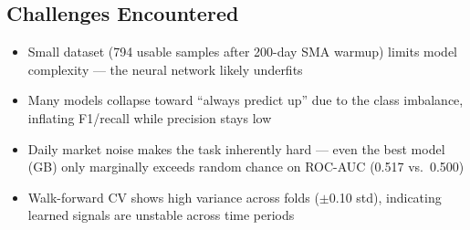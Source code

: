 \documentclass[11pt]{article}
\begin{document}
\subsection*{Challenges Encountered}
\begin{itemize}[nosep, leftmargin=1.2em]
    \item Small dataset (794 usable samples after 200-day SMA warmup) limits model complexity --- the neural network likely underfits
    \item Many models collapse toward ``always predict up'' due to the class imbalance, inflating F1/recall while precision stays low
    \item Daily market noise makes the task inherently hard --- even the best model (GB) only marginally exceeds random chance on ROC-AUC (0.517 vs.\ 0.500)
    \item Walk-forward CV shows high variance across folds ($\pm$0.10 std), indicating learned signals are unstable across time periods
\end{itemize}
\end{document}
